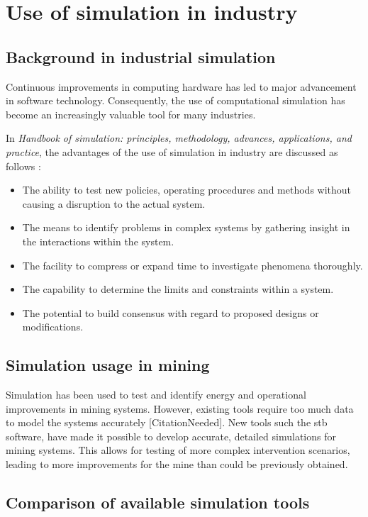 \section{Use of simulation in industry }
	\subsection{Background in industrial simulation}
		Continuous improvements in computing hardware has led to major advancement in software technology. Consequently, the use of computational simulation has become an increasingly valuable tool for many industries.\cite{kocsis2003integration} \par 
		In \textit{ Handbook of simulation: principles, methodology, advances, applications, and practice}, the advantages of the use of simulation in industry are discussed as follows \cite{banks1998handbook}: 
		\begin{itemize}
			\item The ability to test new policies, operating procedures and methods without causing a disruption to the actual system.
			\item The means to identify problems in complex systems by gathering insight in the interactions within the system.
			\item The facility to compress or expand time to investigate phenomena thoroughly.
			\item The capability to determine the limits and constraints within a system.
			\item The potential to build consensus with regard to proposed designs or modifications.
		\end{itemize}

	\subsection{Simulation usage in mining}
		Simulation has been used to test and identify energy and operational improvements in mining systems. However,  existing tools require too much data to model the systems accurately [CitationNeeded].  New tools such the \gls{stb} software, have made it possible to develop accurate, detailed simulations for mining systems. This allows for testing of more complex intervention scenarios, leading to more improvements for the mine than could be previously obtained.
		
	\subsection{Comparison of available simulation tools}
\clearpage

